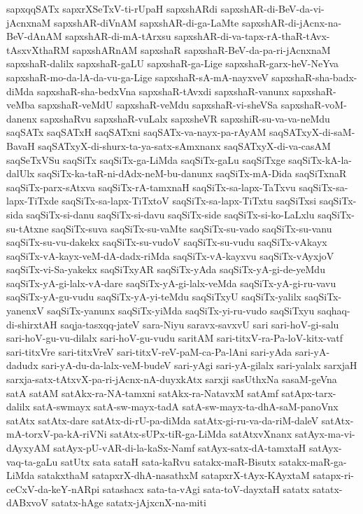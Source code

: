 {sapxqqSATx
sapxrXSeTxV-ti-rUpaH
sapxshARdi
sapxshAR-di-BeV-da-vi-jAcnxnaM
sapxshAR-diVnAM
sapxshAR-di-ga-LaMte
sapxshAR-di-jAcnx-na-BeV-dAnAM
sapxshAR-di-mA-tArxsu
sapxshAR-di-va-tapx-rA-thaR-tAvx-tAsxvXthaRM
sapxshARnAM
sapxshaR
sapxshaR-BeV-da-pa-ri-jAcnxnaM
sapxshaR-dalilx
sapxshaR-gaLU
sapxshaR-ga-Lige
sapxshaR-garx-heV-NeYva
sapxshaR-mo-da-lA-da-vu-ga-Lige
sapxshaR-sA-mA-nayxveV
sapxshaR-sha-badx-diMda
sapxshaR-sha-bedxVna
sapxshaR-tAvxdi
sapxshaR-vanunx
sapxshaR-veMba
sapxshaR-veMdU
sapxshaR-veMdu
sapxshaR-vi-sheVSa
sapxshaR-voM-danenx
sapxshaRvu
sapxshaR-vuLalx
sapxsheVR
sapxshiR-su-va-va-neMdu
saqSATx
saqSATxH
saqSATxni
saqSATx-va-nayx-pa-rAyAM
saqSATxyX-di-saM-BavaH
saqSATxyX-di-shurx-ta-ya-satx-sAmxnanx
saqSATxyX-di-va-casAM
saqSeTxVSu
saqSiTx
saqSiTx-ga-LiMda
saqSiTx-gaLu
saqSiTxge
saqSiTx-kA-la-dalUlx
saqSiTx-ka-taR-ni-dAdx-neM-bu-danunx
saqSiTx-mA-Dida
saqSiTxnaR
saqSiTx-parx-sAtxva
saqSiTx-rA-tamxnaH
saqSiTx-sa-lapx-TaTxvu
saqSiTx-sa-lapx-TiTxde
saqSiTx-sa-lapx-TiTxtoV
saqSiTx-sa-lapx-TiTxtu
saqSiTxsi
saqSiTx-sida
saqSiTx-si-danu
saqSiTx-si-davu
saqSiTx-side
saqSiTx-si-ko-LaLxlu
saqSiTx-su-tAtxne
saqSiTx-suva
saqSiTx-su-vaMte
saqSiTx-su-vado
saqSiTx-su-vanu
saqSiTx-su-vu-dakekx
saqSiTx-su-vudoV
saqSiTx-su-vudu
saqSiTx-vAkayx
saqSiTx-vA-kayx-veM-dA-dadx-riMda
saqSiTx-vA-kayxvu
saqSiTx-vAyxjoV
saqSiTx-vi-Sa-yakekx
saqSiTxyAR
saqSiTx-yAda
saqSiTx-yA-gi-de-yeMdu
saqSiTx-yA-gi-lalx-vA-dare
saqSiTx-yA-gi-lalx-veMda
saqSiTx-yA-gi-ru-vavu
saqSiTx-yA-gu-vudu
saqSiTx-yA-yi-teMdu
saqSiTxyU
saqSiTx-yalilx
saqSiTx-yanenxV
saqSiTx-yanunx
saqSiTx-yiMda
saqSiTx-yi-ru-vudo
saqSiTxyu
saqhaq-di-shirxtAH
saqja-tasxqq-jateV
sara-Niyu
saravx-savxvU
sari
sari-hoV-gi-salu
sari-hoV-gu-vu-dilalx
sari-hoV-gu-vudu
saritAM
sari-titxV-ra-Pa-loV-kitx-vatf
sari-titxVre
sari-titxVreV
sari-titxV-reV-paM-ca-Pa-lAni
sari-yAda
sari-yA-dadudx
sari-yA-du-da-lalx-veM-budeV
sari-yAgi
sari-yA-gilalx
sari-yalalx
sarxjaH
sarxja-satx-tAtxvX-pa-ri-jAcnx-nA-duyxkAtx
sarxji
sasUthxNa
sasaM-geVna
satA
satAM
satAkx-ra-NA-tamxni
satAkx-ra-NatavxM
satAmf
satApx-tarx-dalilx
satA-swmayx
satA-sw-mayx-tadA
satA-sw-mayx-ta-dhA-saM-panoVnx
satAtx
satAtx-dare
satAtx-di-rU-pa-diMda
satAtx-gi-ru-va-da-riM-daleV
satAtx-mA-torxV-pa-kA-riVNi
satAtx-sUPx-tiR-ga-LiMda
satAtxvXnanx
satAyx-ma-vi-dAyxyAM
satAyx-pU-vAR-di-la-kaSx-Namf
satAyx-satx-dA-tamxtaH
satAyx-vaq-ta-gaLu
satUtx
sata
sataH
sata-kaRvu
satakx-maR-Bisutx
satakx-maR-ga-LiMda
satakxthaM
satapxrX-dhA-nasathxM
satapxrX-tAyx-KAyxtaM
satapx-ri-ceCxV-da-keY-nARpi
satashacx
sata-ta-vAgi
sata-toV-dayxtaH
satatx
satatx-dABxvoV
satatx-hAge
satatx-jAjxcnX-na-miti
}
